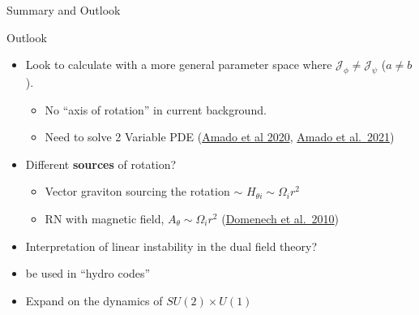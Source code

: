 \documentclass[aspectratio=169, xcolor=dvipsnames]{beamer}
\begin{document}
\begin{frame}{Summary and Outlook}

  \begin{block}{Outlook}
    \begin{itemize}
      \item
        Look to calculate with a more general parameter space where
        \(\mathcal J_\phi\neq\mathcal J_\psi\) (\(a\neq b\)).

        \begin{itemize}
          \item
            No ``axis of rotation'' in current background.
          \item
            Need to solve 2 Variable PDE (\href{https://inspirehep.net/literature/1780844}{Amado et
            al 2020}, \href{https://inspirehep.net/literature/1844790}{Amado et
            al.~2021})
        \end{itemize}
      \item
        Different \textbf{sources} of rotation?

        \begin{itemize}
          \item
            Vector graviton sourcing the rotation $\sim$ 
            \(H_{\theta i} \sim \Omega_i r^2\)
          \item
            RN with magnetic field, \(A_\theta \sim \Omega_i r^2\)
            (\href{https://inspirehep.net/literature/854786}{Domenech et al.~2010})
        \end{itemize}
      \item
        Interpretation of linear instability in the dual field theory?
      \item
        be used in ``hydro codes''
      \item
        Expand on the dynamics of $SU(2)\times U(1)$
    \end{itemize}
  \end{block}

\end{frame}
\end{document}
